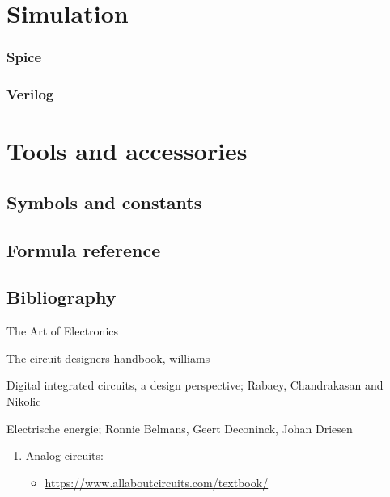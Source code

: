 \documentclass{report}
\begin{document}
\part{Simulation}
\section{Spice}
\section{Verilog}

\part{Tools and accessories}


\appendix

\chapter{Symbols and constants}

\chapter{Formula reference}

\chapter{Bibliography}

The Art of Electronics

The circuit designers handbook, williams

Digital integrated circuits, a design perspective; Rabaey, Chandrakasan and Nikolic

Electrische energie; Ronnie Belmans, Geert Deconinck, Johan Driesen

\begin{enumerate}
\item Analog circuits:
\begin{itemize}
\item \url{https://www.allaboutcircuits.com/textbook/}
\end{itemize}
\end{enumerate}
\end{document}
